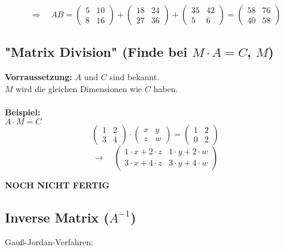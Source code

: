 \documentclass[12pt,a4paper]{article}
\begin{document}
\[
\Rightarrow
\quad
AB =
\begin{pmatrix}
    5 & 10 \\
    8 & 16
\end{pmatrix}
+
\begin{pmatrix}
    18 & 24 \\
    27 & 36
\end{pmatrix}
+
\begin{pmatrix}
    35 & 42 \\
    5 & 6
\end{pmatrix}
=
\begin{pmatrix}
    58 & 76 \\
    40 & 58
\end{pmatrix}
\]

\newpage
\subsection{"Matrix Division" (Finde bei $M \cdot A = C$, $M$)}
\textbf{Vorraussetzung:} $A$ und $C$ sind bekannt. \\
$M$ wird die gleichen Dimensionen wie $C$ haben. \\ \\
\textbf{Beispiel:} \\
$A \cdot M = C$ \\
\[
\begin{pmatrix}
1 & 2 \\
3 & 4
\end{pmatrix}
\cdot
\begin{pmatrix}
x & y \\
z & w
\end{pmatrix}
=
\begin{pmatrix}
    1 & 2 \\
    0 & 2
\end{pmatrix}
\]
\[
\rightarrow
\quad
\begin{pmatrix}
1 \cdot x + 2 \cdot z & 1 \cdot y + 2 \cdot w \\
3 \cdot x + 4 \cdot z & 3 \cdot y + 4 \cdot w
\end{pmatrix}
\]

\textbf{NOCH NICHT FERTIG}


\subsection{Inverse Matrix ($A^{-1}$)}

Gauß-Jordan-Verfahren: \\
\end{document}
